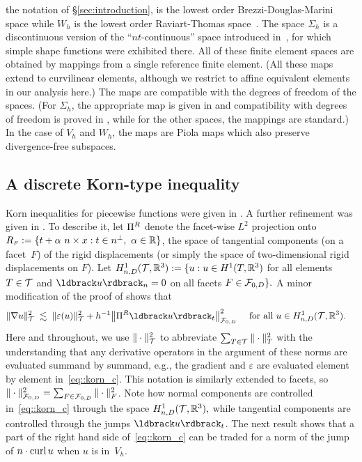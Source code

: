 the notation of \S\ref{sec:introduction}, is the lowest order
Brezzi-Douglas-Marini space while $W_h$ is the lowest order
Raviart-Thomas space~\cite{brezzi2012mixed}.
The space $\Sigma_h$ is a discontinuous version of the ``$nt$-continuous''
space introduced in~\cite{mcsI},
for which simple shape functions were exhibited there.
All of these finite element spaces are obtained by mappings from a
single reference finite element.  (All these maps extend to curvilinear
elements, although we restrict to affine equivalent elements in our
analysis here.)  The maps are compatible with the degrees of freedom of the
spaces. (For $\Sigma_h$, the appropriate map is given in \cite{mcsI} and
compatibility with degrees of freedom is proved in
\cite[Lemma~5.7]{mcsI}, while for the other spaces, the mappings are
standard.)  In the case of $V_h$ and $W_h$, the maps are Piola maps
which also preserve divergence-free subspaces.


\subsection{A discrete Korn-type inequality}
\label{ssec:discrete-korn-type}



Korn inequalities for piecewise functions were given in
\cite[Theorem~3.1]{brenner_korn}. A further refinement  was given
in \cite[Theorem~3.1]{MardaWinth06}. To describe it, let ${\Pi^{R}}$ denote
the facet-wise $L^2$ projection onto
${R_{\scriptscriptstyle F}} := \{t + \alpha~ n\times x : t \in n^\perp,~\alpha\in\mathbb{R}\}$, the
space of tangential components (on a facet~$F$) of the rigid
displacements (or simply the space of two-dimensional rigid
displacements on $F$).  Let
$ H^1_{n, D}(\mathcal{T},\mathbb{R}^3) := \{ u: u \in H^1(T,\mathbb{R}^3)$ for all elements
$T \in \mathcal{T}$ and $ {\jump{u}}_n = 0$ on all facets {$F \in \mathcal{F}_{0, D} \}.$} A minor modification of the proof of
\cite[Theorem~3.1]{MardaWinth06} shows that 
\begin{align}\label{eq::korn_c}    
  \| \nabla u \|_\mesh^2
  & \;\lesssim\;
    \| \eps(u) \|_\mesh^2+  h^{-1}
    \big\| \PiR\jump{u}_t \big\|_{{\facets_{0, D}}}^2
    \quad\text{ for all } 
    u \in
    H^1_{n, D}(\mesh, \rr^3).
\end{align}
Here and throughout, we use $\| \cdot \|_{\mathcal{T}}^2$
to abbreviate
$\sum_{T \in \mathcal{T}} \| \cdot \|_T^2$  with the
understanding that any derivative operators in the argument of these
norms are evaluated summand by summand, e.g., the gradient and
$\varepsilon$ are evaluated element by element in~\eqref{eq::korn_c}.
This notation is similarly extended to facets, so 
$\| \cdot \|_{{\mathcal{F}_{0, D}}}^2
=\sum_{F \in \mathcal{F}_{0, D}} \| \cdot \|_F^2$.
Note how normal components are controlled in~\eqref{eq::korn_c}
through the space $H^1_{n, D}(\mathcal{T}, \mathbb{R}^3),$ while tangential components
are controlled through the jumps $\jump{u}_t$.
The next result shows that
a part of the right hand side of~\eqref{eq::korn_c}
can be traded for 
a norm of  the jump of $n \cdot \operatorname{curl} u$ when $u$ is
in~$V_h$.



